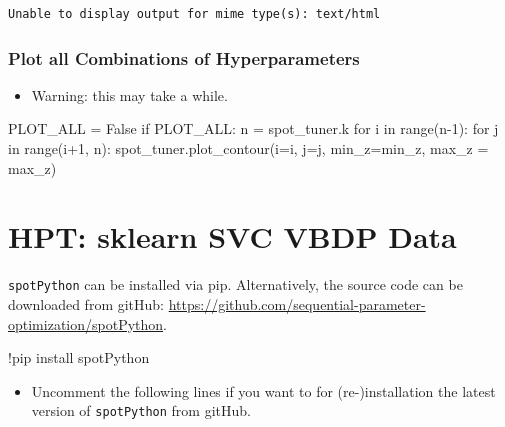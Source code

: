 \documentclass[
  letterpaper,
  DIV=11,
  numbers=noendperiod]{scrreprt}
\newenvironment{Shaded}{\begin{snugshade}}{\end{snugshade}}
\newcommand{\BuiltInTok}[1]{\textcolor[rgb]{0.00,0.23,0.31}{#1}}
\newcommand{\ControlFlowTok}[1]{\textcolor[rgb]{0.00,0.23,0.31}{#1}}
\newcommand{\DecValTok}[1]{\textcolor[rgb]{0.68,0.00,0.00}{#1}}
\newcommand{\KeywordTok}[1]{\textcolor[rgb]{0.00,0.23,0.31}{#1}}
\newcommand{\NormalTok}[1]{\textcolor[rgb]{0.00,0.23,0.31}{#1}}
\newcommand{\OperatorTok}[1]{\textcolor[rgb]{0.37,0.37,0.37}{#1}}
\newcommand{\VariableTok}[1]{\textcolor[rgb]{0.07,0.07,0.07}{#1}}
\providecommand{\tightlist}{%
  \setlength{\itemsep}{0pt}\setlength{\parskip}{0pt}}\usepackage{longtable,booktabs,array}
\begin{document}
\begin{verbatim}
Unable to display output for mime type(s): text/html
\end{verbatim}

\hypertarget{plot-all-combinations-of-hyperparameters-3}{%
\subsection{Plot all Combinations of
Hyperparameters}\label{plot-all-combinations-of-hyperparameters-3}}

\begin{itemize}
\tightlist
\item
  Warning: this may take a while.
\end{itemize}

\begin{Shaded}
\begin{Highlighting}[]
\NormalTok{PLOT\_ALL }\OperatorTok{=} \VariableTok{False}
\ControlFlowTok{if}\NormalTok{ PLOT\_ALL:}
\NormalTok{    n }\OperatorTok{=}\NormalTok{ spot\_tuner.k}
    \ControlFlowTok{for}\NormalTok{ i }\KeywordTok{in} \BuiltInTok{range}\NormalTok{(n}\OperatorTok{{-}}\DecValTok{1}\NormalTok{):}
        \ControlFlowTok{for}\NormalTok{ j }\KeywordTok{in} \BuiltInTok{range}\NormalTok{(i}\OperatorTok{+}\DecValTok{1}\NormalTok{, n):}
\NormalTok{            spot\_tuner.plot\_contour(i}\OperatorTok{=}\NormalTok{i, j}\OperatorTok{=}\NormalTok{j, min\_z}\OperatorTok{=}\NormalTok{min\_z, max\_z }\OperatorTok{=}\NormalTok{ max\_z)}
\end{Highlighting}
\end{Shaded}

\hypertarget{sec-hpt-sklearn-svc-vbdp-data}{%
\chapter{HPT: sklearn SVC VBDP
Data}\label{sec-hpt-sklearn-svc-vbdp-data}}

\texttt{spotPython} can be installed via pip. Alternatively, the source
code can be downloaded from gitHub:
\url{https://github.com/sequential-parameter-optimization/spotPython}.

\begin{Shaded}
\begin{Highlighting}[]
\NormalTok{!pip install spotPython}
\end{Highlighting}
\end{Shaded}

\begin{itemize}
\tightlist
\item
  Uncomment the following lines if you want to for (re-)installation the
  latest version of \texttt{spotPython} from gitHub.
\end{itemize}
\end{document}
